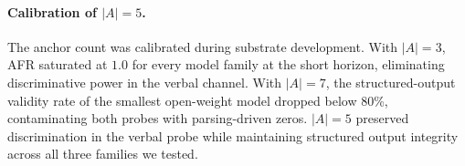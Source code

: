 \paragraph{Calibration of $|A| = 5$.}
The anchor count was calibrated during substrate development. With
$|A| = 3$, AFR saturated at $1.0$ for every model family at the
short horizon, eliminating discriminative power in the verbal
channel. With $|A| = 7$, the structured-output validity rate of
the smallest open-weight model dropped below 80\%, contaminating
both probes with parsing-driven zeros. $|A| = 5$ preserved
discrimination in the verbal probe while maintaining structured
output integrity across all three families we tested.
